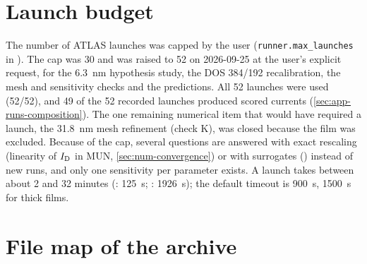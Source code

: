 \section{Launch budget}\label{sec:repro-budget}

The number of ATLAS launches was capped by the user (\texttt{runner.max\_launches} in ). The cap
was 30 and was raised to 52 on 2026-09-25 at the user's explicit request, for the \SI{6.3}{nm} hypothesis study, the DOS
384/192 recalibration, the mesh and sensitivity checks and the predictions. All 52 launches were used (52/52), and 49
of the 52 recorded launches produced scored currents (\cref{sec:app-runs-composition}). The one remaining numerical item
that would have required a launch, the \SI{31.8}{nm} mesh refinement (check K), was closed because the film was
excluded. Because of the cap, several questions are answered with exact rescaling (linearity of $I_{\mathrm{D}}$ in MUN,
\cref{sec:num-convergence}) or with surrogates (\evSURR) instead of new runs, and only one sensitivity per parameter
exists. A launch takes between about 2 and 32 minutes (: \SI{125}{s};
: \SI{1926}{s}); the default timeout is \SI{900}{s}, \SI{1500}{s} for thick films.

\section{File map of the archive}\label{sec:repro-filemap}

